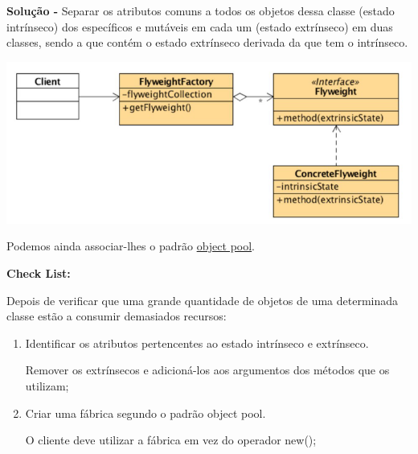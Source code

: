 \documentclass{article}
\begin{document}
\begin{flushleft}
    \textbf{Solução -} Separar os atributos comuns a todos os objetos dessa classe (estado intrínseco)
    dos específicos e mutáveis em cada um (estado extrínseco) em duas classes,
    sendo a que contém o estado extrínseco derivada da que tem o intrínseco.

    \begin{center}
        \includegraphics[scale=0.35]{Images/52.png}
    \end{center}

    Podemos ainda associar-lhes o padrão \uline{object pool}.
\end{flushleft}

\begin{flushleft}
    \textbf{Check List:}

    \vspace{3mm}
    Depois de verificar que uma grande quantidade de objetos de uma determinada
    classe estão a consumir demasiados recursos:

    \begin{enumerate}
        \item Identificar os atributos pertencentes ao estado intrínseco e extrínseco.
        
        Remover os extrínsecos e adicioná-los aos argumentos dos métodos que
        os utilizam;
        \item Criar uma fábrica segundo o padrão object pool.
        
        O cliente deve utilizar a fábrica em vez do operador new();
    \end{enumerate}
\end{flushleft}

\pagebreak
\end{document}
